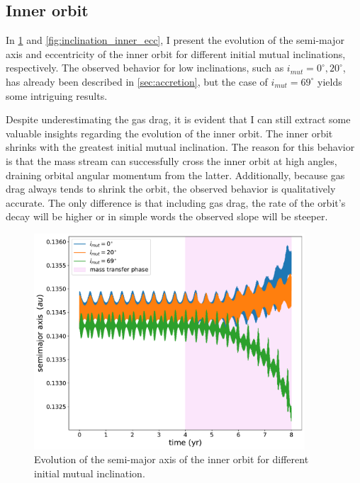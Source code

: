 \subsection{Inner orbit}

In \cref{fig:inclination_inner_semimajor_axis} and \cref{fig:inclination_inner_ecc}, I present the evolution of the semi-major axis and eccentricity of the inner orbit for different initial mutual inclinations, respectively. The observed behavior for low inclinations, such as $i_{mut}=0^{\circ}, 20^{\circ}$, has already been described in \cref{sec:accretion}, but the case of $i_{mut}=69^{\circ}$ yields some intriguing results.

Despite underestimating the gas drag, it is evident that I can still extract some valuable insights regarding the evolution of the inner orbit. The inner orbit shrinks with the greatest initial mutual inclination. The reason for this behavior is that the mass stream can successfully cross the inner orbit at high angles, draining orbital angular momentum from the latter. Additionally, because gas drag always tends to shrink the orbit, the observed behavior is qualitatively accurate. The only difference is that including gas drag, the rate of the orbit's decay will be higher or in simple words the observed slope will be steeper. 
\begin{figure}[H]
    \centering
    \includegraphics[width=0.9\textwidth]{Thesis/graphs/inclination_case/inclination_inner_semimajor_axis.pdf}
    \caption{Evolution of the semi-major axis of the inner orbit for different initial mutual inclination.}
    \label{fig:inclination_inner_semimajor_axis}
\end{figure}
